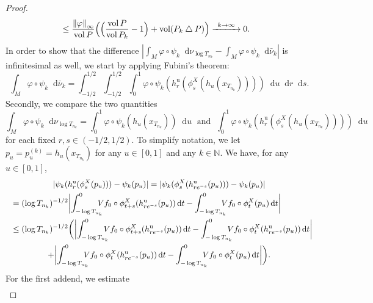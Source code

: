 \documentclass[10pt]{amsart}
\newcommand\To[1]{\mathchoice{\xrightarrow{\kern4pt#1\kern3pt}}{\stackrel{#1}{\longrightarrow}}{}{}}
\newcommand \N{\mathbb{N}}
\newcommand*{\diff}{\mathop{}\!\mathrm{d}}
\newcommand{\norm}[1]{\left\lVert#1\right\rVert}
\DeclareMathOperator{\vol}{vol}
\theoremstyle{definition}
\begin{document}
\begin{appendix}
\begin{proof}
\begin{align*}
&\leq \frac{\norm{\varphi}_{\infty}}{\vol{P}}\Bigl(\Bigl(\frac{\vol{P}}{\vol{P_k}}-1\Bigr)+\vol(P_k\bigtriangleup P)\Bigr)\To{k\to\infty} 0.
\end{align*}
In order to show that the difference $|\int_{M}\varphi\circ \psi_k\diff\nu_{\log{T_{n_k}}}-\int_{M}\varphi\circ \psi_k\diff\bar{\nu}_k |$ is infinitesimal as well, we start by applying Fubini's theorem:
\begin{equation}
\label{Fubini}
\int_{M}\varphi\circ \psi_k\diff\bar{\nu}_k=\int_{-1/2}^{1/2}\int_{-1/2}^{1/2}\int_{0}^{1}\varphi\circ\psi_k(h^{\mathrm{u}}_r(\phi^{X}_{s}(h_u(x_{T_{n_k}}))))\diff u\diff r\diff s.
\end{equation}
Secondly, we compare the two quantities
\begin{equation*}
\int_{M}\varphi\circ \psi_k\diff\nu_{\log{T_{n_k}}}=\int_{0}^{1}\varphi\circ\psi_k(h_{u}(x_{T_{n_k}}))\diff u\; \text{ and }\;\int_{0}^{1}\varphi\circ\psi_k(h^{\mathrm{u}}_r(\phi^{X}_{s}(h_u(x_{T_{n_k}}))))\diff u
\end{equation*}
for each fixed $r,s\in (-1/2,1/2)$. To simplify notation, we let $p_u=p_u^{(k)}=h_u(x_{T_{n_k}})$ for any $u\in [0,1]$ and any $k\in \N$. We have, for any $u\in [0,1]$,
\begin{multline*}
|\psi_k(h^{\mathrm{u}}_r(\phi^{X}_s(p_u)))-\psi_k(p_u)|=|\psi_k(\phi^{X}_s(h^{\mathrm{u}}_{re^{-s}}(p_u)))-\psi_k(p_u)|\\
\shoveleft{=(\log{T_{n_k}})^{-1/2}\biggl|\int_{-\log{T_{n_k}}}^{0}\hspace*{-3mm}Vf_0\circ \phi^{X}_{t+s}(h^{\mathrm{u}}_{re^{-s}}(p_u))\diff t-\int_{-\log{T_{n_k}}}^{0}\hspace*{-3mm}Vf_0\circ \phi_t^{X}(p_u)\diff t\biggr|}\\
\shoveleft{\leq (\log{T_{n_k}})^{-1/2}\bigg(\biggl|\int_{-\log{T_{n_k}}}^{0}\hspace*{-3mm}Vf_0\circ \phi^{X}_{t+s}(h^{\mathrm{u}}_{re^{-s}}(p_u))\diff t
-\int_{-\log{T_{n_k}}}^{0}\hspace*{-3mm}Vf_0\circ \phi^{X}_{t}(h^{\mathrm{u}}_{re^{-s}}(p_u))\diff t\biggr|}\\
+\biggl|\int_{-\log{T_{n_k}}}^{0}\hspace*{-3mm}Vf_0\circ \phi^{X}_{t}(h^{\mathrm{u}}_{re^{-s}}(p_u))\diff t-\int_{-\log{T_{n_k}}}^{0}\hspace*{-3mm}Vf_0\circ \phi_t^{X}(p_u)\diff t\biggr|\bigg).
\end{multline*}
For the first addend, we estimate
\begin{align*}

\end{align*}
\end{proof}
\end{appendix}
\end{document}
